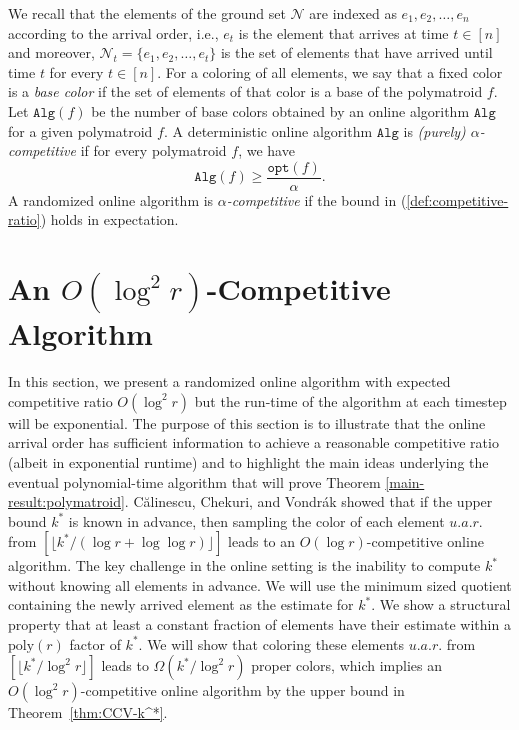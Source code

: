 \documentclass[11pt]{article}
\theoremstyle{definition}
\newcommand{\calN}{{\mathcal{N}}}
\newcommand{\opt}{\texttt{opt}}
\begin{document}
We recall that the elements of the ground set $\calN$ are indexed as $e_1, e_2, \ldots, e_n$ according to the arrival order, i.e., $e_t$ is the element that arrives at time $t\in [n]$ and moreover, $\calN_t=\{e_1, e_2, \ldots, e_t\}$ is the set of elements that have arrived until time $t$ for every $t\in [n]$. For a coloring of all elements, we say that a fixed color is a \emph{base color} if the set of elements of that color is a base of the polymatroid $f$. 
Let $\texttt{Alg}(f)$ be the number of base colors obtained by an online algorithm $\texttt{Alg}$ for a given polymatroid $f$. A deterministic online algorithm $\texttt{Alg}$ is \emph{(purely) $\alpha$-competitive} if for every polymatroid $f$, we have
\begin{equation}
    \texttt{Alg}(f)\geq \frac{\opt(f)}{\alpha}. \label{def:competitive-ratio}
\end{equation}
A randomized online algorithm is \emph{$\alpha$-competitive} if the bound in (\ref{def:competitive-ratio}) holds in expectation.  \section{An $O(\log^2 r)$-Competitive Algorithm}\label{section:algorithm}
In this section, we present a randomized online algorithm with expected competitive ratio $O(\log^2 r)$ but the run-time of the algorithm at each timestep will be exponential. The purpose of this section is to illustrate that the online arrival order has sufficient information to achieve a reasonable competitive ratio (albeit in exponential runtime) and to highlight the main ideas underlying the eventual polynomial-time algorithm that will prove Theorem \ref{main-result:polymatroid}. \iffalse
C{\u{a}}linescu, Chekuri, and Vondr\'{a}k \cite{CCV09} showed that if the upper bound $k^*$ is known in advance, then sampling the color of each element $\textit{u.a.r.}$ from $[\lfloor k^*/(\log r + \log\log r) \rfloor]$ leads to an $O(\log r)$-competitive online algorithm. The key challenge in the online setting is the inability to compute $k^*$ without knowing all elements in advance. We will use the minimum sized quotient containing the newly arrived element as the estimate for $k^*$. We show a structural property that at least a constant fraction of elements have their estimate within a $\text{poly}(r)$ factor of $k^*$. We will show that coloring these elements $\textit{u.a.r.}$ from $[\lfloor k^*/\log^2 r \rfloor]$ leads to $\Omega(k^*/\log^2 r)$ proper colors, which implies an $O(\log^2 r)$-competitive online algorithm by the upper bound in Theorem~\ref{thm:CCV-k^*}.
\end{document}
